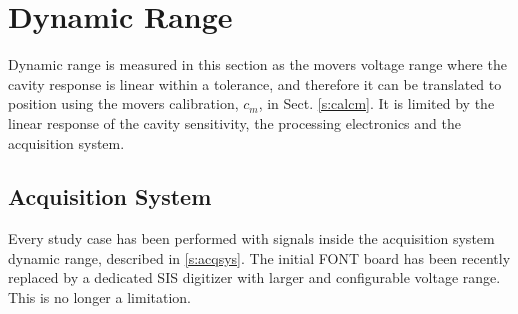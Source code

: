 \section{Dynamic Range}\label{s:dynrange}
Dynamic range is measured in this section as the movers voltage range where the cavity response is linear within a tolerance, and therefore it can be translated to position using the movers calibration, $c_m$, in Sect. \ref{s:calcm}. It is limited by the linear response of the cavity sensitivity, the processing electronics and the acquisition system.\par
\subsection{Acquisition System}
Every study case has been performed with signals inside the acquisition system dynamic range, described in \ref{s:acqsys}. The initial FONT board has been recently replaced by a dedicated SIS digitizer with larger and configurable voltage range. This is no longer a limitation.\par
